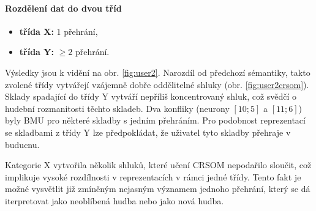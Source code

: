 \documentclass[thesis=M,czech]{FITthesis}[2012/06/26]
\begin{document}
\paragraph{Rozdělení dat do dvou tříd}
\begin{itemize}
\item \textbf{třída X:} $1$ přehrání,
\item \textbf{třída Y:} $\geq2$ přehrání.
\end{itemize}

Výsledky jsou k vidění na obr. \ref{fig:user2}. Narozdíl od předchozí sémantiky, takto zvolené třídy vytvářejí vzájemně dobře oddělitelné shluky (obr. \ref{fig:user2crsom}). Sklady spadající do třídy Y vytváří nepříliš koncentrovaný shluk, což svědčí o hudební rozmanitosti těchto skladeb. Dva konfliky (neurony $[10;5]$ a $[11;6]$) byly BMU pro některé skladby s jedním přehráním. Pro podobnost reprezentací se skladbami z třídy Y lze předpokládat, že uživatel tyto skladby přehraje v buducnu.

Kategorie X vytvořila několik shluků, které učení CRSOM nepodařilo sloučit, což implikuje vysoké rozdílnosti v reprezentacích v rámci jedné třídy. Tento fakt je možné vysvětlit již zmíněným nejasným významem jednoho přehrání, který se dá iterpretovat jako neoblíbená hudba nebo jako nová hudba.  
\end{document}

